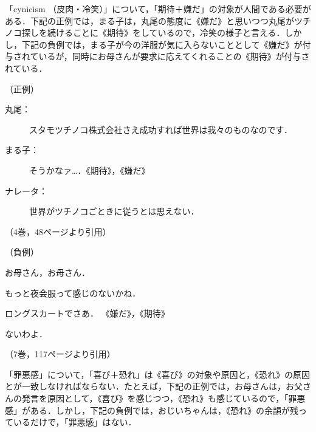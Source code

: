 \documentclass[japanese]{jnlp_1.3c}
\begin{document}
\begin{itemize}
\item 「cynicism （皮肉・冷笑）」について，「期待＋嫌だ」の対象が人間である必要がある．下記の正例では，まる子は，丸尾の態度に《嫌だ》と思いつつ丸尾がツチノコ探しを続けることに《期待》をしているので，冷笑の様子と言える．しかし，下記の負例では，まる子が今の洋服が気に入らないこととして《嫌だ》が付与されているが，同時にお母さんが要求に応えてくれることの《期待》が付与されている．

  \begin{description}
  \item （正例）
    \begin{description}
    \item [丸尾：] スタモツチノコ株式会社さえ成功すれば世界は我々のものなのです．
    \item [まる子：] そうかなァ…．《期待》，《嫌だ》
    \item [ナレータ：] 世界がツチノコごときに従うとは思えない．
    \end{description}
    \begin{flushright}
    （4巻，48ページより引用）
    \end{flushright}

  \item （負例）
    \begin{description}
    \item [まる子：] お母さん，お母さん．
    \item もっと夜会服って感じのないかね．
    \item ロングスカートでさあ． 《嫌だ》，《期待》
    \item [お母さん：] ないわよ．
    \end{description}
    \begin{flushright}
    （7巻，117ページより引用）
    \end{flushright}
  \end{description}

\item 「罪悪感」について，「喜び＋恐れ」は《喜び》の対象や原因と，《恐れ》の原因とが一致しなければならない．たとえば，下記の正例では，お母さんは，お父さんの発言を原因として，《喜び》を感じつつ，《恐れ》も感じているので，「罪悪感」がある．しかし，下記の負例では，おじいちゃんは，《恐れ》の余韻が残っているだけで，「罪悪感」はない．


\end{itemize}
\end{document}
